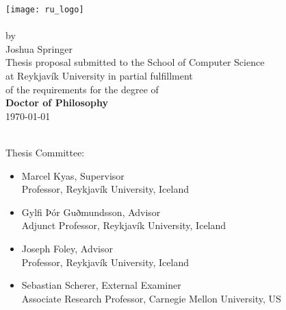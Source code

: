 \begin{titlepage}
    \Large
   \begin{center}

       \vspace*{1cm}

       \texttt{[image: ru\_logo]}~\\[1cm]
       \textbf{\documenttitle}
       ~\\[0.5cm]
       by
       ~\\[0.5cm]
       Joshua Springer
       ~\\[1cm]
       Thesis proposal submitted to the School of Computer Science\\
       at Reykjavík University in partial fulfillment\\
       of the requirements for the degree of\\
       \textbf{Doctor of Philosophy}
       ~\\[0.5cm]
       \specialdate\today
   \end{center}
~\\[0.5cm]
Thesis Committee:
\begin{itemize}[label=\null, leftmargin=1.75cm]
    \item Marcel Kyas, Supervisor\\Professor, Reykjavík University, Iceland
    \item Gylfi Þór Guðmundsson, Advisor\\Adjunct Professor, Reykjavík University, Iceland
    \item Joseph Foley, Advisor\\Professor, Reykjavík University, Iceland
    \item Sebastian Scherer, External Examiner\\Associate Research Professor, Carnegie Mellon University, US
\end{itemize}

\end{titlepage}